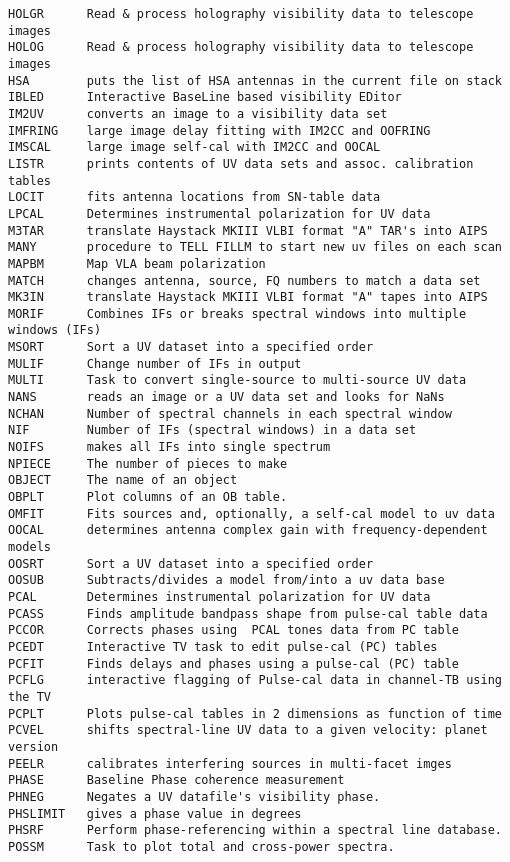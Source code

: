 \begin{verbatim}
HOLGR      Read & process holography visibility data to telescope images
HOLOG      Read & process holography visibility data to telescope images
HSA        puts the list of HSA antennas in the current file on stack
IBLED      Interactive BaseLine based visibility EDitor
IM2UV      converts an image to a visibility data set
IMFRING    large image delay fitting with IM2CC and OOFRING
IMSCAL     large image self-cal with IM2CC and OOCAL
LISTR      prints contents of UV data sets and assoc. calibration tables
LOCIT      fits antenna locations from SN-table data
LPCAL      Determines instrumental polarization for UV data
M3TAR      translate Haystack MKIII VLBI format "A" TAR's into AIPS
MANY       procedure to TELL FILLM to start new uv files on each scan
MAPBM      Map VLA beam polarization
MATCH      changes antenna, source, FQ numbers to match a data set
MK3IN      translate Haystack MKIII VLBI format "A" tapes into AIPS
MORIF      Combines IFs or breaks spectral windows into multiple windows (IFs)
MSORT      Sort a UV dataset into a specified order
MULIF      Change number of IFs in output
MULTI      Task to convert single-source to multi-source UV data
NANS       reads an image or a UV data set and looks for NaNs
NCHAN      Number of spectral channels in each spectral window
NIF        Number of IFs (spectral windows) in a data set
NOIFS      makes all IFs into single spectrum
NPIECE     The number of pieces to make
OBJECT     The name of an object
OBPLT      Plot columns of an OB table.
OMFIT      Fits sources and, optionally, a self-cal model to uv data
OOCAL      determines antenna complex gain with frequency-dependent models
OOSRT      Sort a UV dataset into a specified order
OOSUB      Subtracts/divides a model from/into a uv data base
PCAL       Determines instrumental polarization for UV data
PCASS      Finds amplitude bandpass shape from pulse-cal table data
PCCOR      Corrects phases using  PCAL tones data from PC table
PCEDT      Interactive TV task to edit pulse-cal (PC) tables
PCFIT      Finds delays and phases using a pulse-cal (PC) table
PCFLG      interactive flagging of Pulse-cal data in channel-TB using the TV
PCPLT      Plots pulse-cal tables in 2 dimensions as function of time
PCVEL      shifts spectral-line UV data to a given velocity: planet version
PEELR      calibrates interfering sources in multi-facet imges
PHASE      Baseline Phase coherence measurement
PHNEG      Negates a UV datafile's visibility phase.
PHSLIMIT   gives a phase value in degrees
PHSRF      Perform phase-referencing within a spectral line database.
POSSM      Task to plot total and cross-power spectra.

\end{verbatim}
